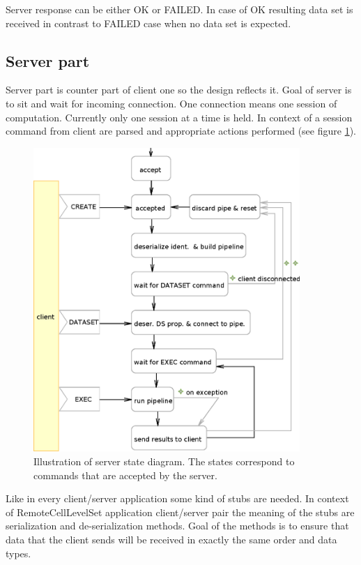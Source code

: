 Server response can be either OK or FAILED.
In case of OK resulting data set is received in contrast to FAILED case when no data set is expected.

\subsection{Server part}

Server part is counter part of client one so the design reflects it.
Goal of server is to sit and wait for incoming connection.
One connection means one session of computation.
Currently only one session at a time is held.
In context of a session command from client are parsed and appropriate actions performed (see figure \ref{fg:RCServerCycle}).

\begin{figure}
    \centering
    \includegraphics[width=0.9\textwidth]{data/RCServerCycle}
    \caption[MedV4D server cycle]
{
Illustration of server state diagram.
The states correspond to commands that are accepted by the server.
}
    \label{fg:RCServerCycle}
\end{figure}

Like in every client/server application some kind of stubs are needed.
In context of RemoteCellLevelSet application client/server pair the meaning of the stubs are serialization and de-serialization methods.
Goal of the methods is to ensure that data that the client sends will be received in exactly the same order and data types.

